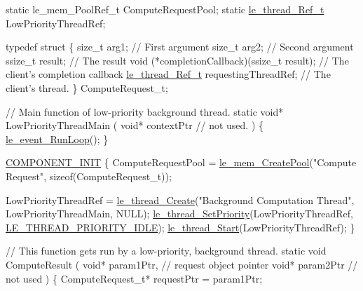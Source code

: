 \begin{DoxyCode}
\textcolor{keyword}{static} le\_mem\_PoolRef\_t ComputeRequestPool;
\textcolor{keyword}{static} \hyperlink{le__thread_8h_a32121104c6b4ca39008eb79a4d6862f2}{le\_thread\_Ref\_t} LowPriorityThreadRef;

\textcolor{keyword}{typedef} \textcolor{keyword}{struct}
\{
    \textcolor{keywordtype}{size\_t}           arg1;                                   \textcolor{comment}{// First argument}
    \textcolor{keywordtype}{size\_t}           arg2;                                   \textcolor{comment}{// Second argument}
    ssize\_t          result;                                 \textcolor{comment}{// The result}
    void           (*completionCallback)(ssize\_t result);    \textcolor{comment}{// The client's completion callback}
    \hyperlink{le__thread_8h_a32121104c6b4ca39008eb79a4d6862f2}{le\_thread\_Ref\_t}  requestingThreadRef;                    \textcolor{comment}{// The client's thread.}
\}
ComputeRequest\_t;

\textcolor{comment}{// Main function of low-priority background thread.}
\textcolor{keyword}{static} \textcolor{keywordtype}{void}* LowPriorityThreadMain
(
    \textcolor{keywordtype}{void}* contextPtr \textcolor{comment}{// not used.}
)
\{
    \hyperlink{le__event_loop_8h_ae313b457994371c658be9fe0494a01ff}{le\_event\_RunLoop}();
\}

\hyperlink{le__event_loop_8h_abdb9187a56836a93d19cc793cbd4b7ec}{COMPONENT\_INIT}
\{
    ComputeRequestPool = \hyperlink{le__mem_8h_ab91efaa2978c9c1c7b2427d25b33241c}{le\_mem\_CreatePool}(\textcolor{stringliteral}{"Compute Request"}, \textcolor{keyword}{sizeof}(ComputeRequest\_t));

    LowPriorityThreadRef = \hyperlink{le__thread_8h_a87e02a46f92e9e3e11ed28a2b265872f}{le\_thread\_Create}(\textcolor{stringliteral}{"Background Computation Thread"},
                                            LowPriorityThreadMain,
                                            NULL);
    \hyperlink{le__thread_8h_a95257a2f60cacdadc787647453b77356}{le\_thread\_SetPriority}(LowPriorityThreadRef, 
      \hyperlink{le__thread_8h_a653b0f17cd4d4567c86a25e23d004f07a8237422b4c3d3df0ffcdbc9981c45d98}{LE\_THREAD\_PRIORITY\_IDLE});
    \hyperlink{le__thread_8h_a38df3877ee5ab9fac17b2fc0be46c27e}{le\_thread\_Start}(LowPriorityThreadRef);
\}

\textcolor{comment}{// This function gets run by a low-priority, background thread.}
\textcolor{keyword}{static} \textcolor{keywordtype}{void} ComputeResult
(
    \textcolor{keywordtype}{void}* param1Ptr, \textcolor{comment}{// request object pointer}
    \textcolor{keywordtype}{void}* param2Ptr  \textcolor{comment}{// not used}
)
\{
    ComputeRequest\_t* requestPtr = param1Ptr;


\end{DoxyCode}
